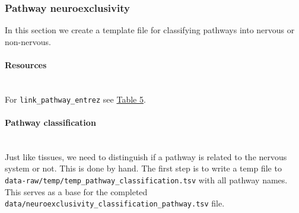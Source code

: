 \hypertarget{pathway-neuroexclusivity}{%
\subsubsection{Pathway
neuroexclusivity}\label{pathway-neuroexclusivity}}

In this section we create a template file for classifying pathways into
nervous or non-nervous.

\hypertarget{resources-1}{%
\paragraph{\texorpdfstring{\textbf{Resources}}{Resources}}\label{resources-1}}

\texttt{}\\
For \texttt{link\_pathway\_entrez} see
\hyperref[tab:link_pathway_entrez]{Table 5}.

\begin{table}[H]

\caption{\label{tab:pathway_names}KEGG pathway names.}
\end{table}

\hypertarget{pathway-classification}{%
\paragraph{\texorpdfstring{\textbf{Pathway
classification}}{Pathway classification}}\label{pathway-classification}}

\texttt{}\\
Just like tissues, we need to distinguish if a pathway is related to the
nervous system or not. This is done by hand. The first step is to write
a temp file to \texttt{data-raw/temp/temp\_pathway\_classification.tsv}
with all pathway names. This serves as a base for the completed
\texttt{data/neuroexclusivity\_classification\_pathway.tsv} file.

